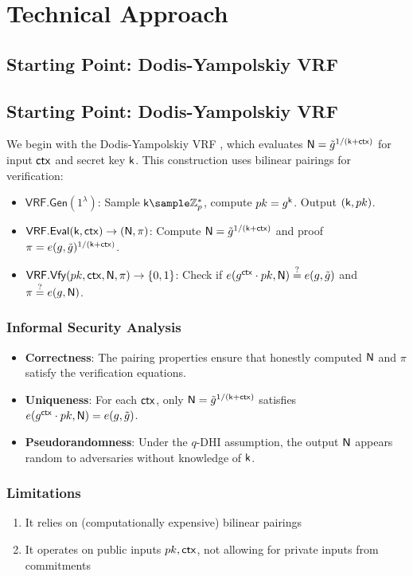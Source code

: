 \section{Technical Approach}

\subsection{Starting Point: Dodis-Yampolskiy VRF}

\subsection{Starting Point: Dodis-Yampolskiy VRF}
We begin with the Dodis-Yampolskiy VRF \cite{hutchison_verifiable_2005}, which evaluates $\mathsf{N} = \tilde{g}^{1/(\mathsf{k} + \mathsf{ctx})}$ for input $\mathsf{ctx}$ and secret key $\mathsf{k}$. This construction uses bilinear pairings for verification:

\begin{itemize}
    \item $\mathsf{VRF.Gen}(1^\lambda)$: Sample $\k \sample \mathbb{Z}_p^*$, compute $pk = g^{\mathsf{k}}$. Output $(\mathsf{k}, pk)$.
    \item $\mathsf{VRF.Eval}(\mathsf{k}, \mathsf{ctx}) \to (\mathsf{N}, \pi)$: Compute $\mathsf{N} = \tilde{g}^{1/(\mathsf{k} + \mathsf{ctx})}$ and proof $\pi = e(g, \tilde{g})^{1/(\mathsf{k} + \mathsf{ctx})}$.
    \item $\mathsf{VRF.Vfy}(pk, \mathsf{ctx}, \mathsf{N}, \pi) \to \{0, 1\}$: Check if $e(g^{\mathsf{ctx}} \cdot pk, \mathsf{N}) \stackrel{?}{=} e(g, \tilde{g})$ and $\pi \stackrel{?}{=} e(g, \mathsf{N})$.
\end{itemize}

\subsubsection{Informal Security Analysis}
\begin{itemize}
    \item \textbf{Correctness}: The pairing properties ensure that honestly computed $\mathsf{N}$ and $\pi$ satisfy the verification equations.
    \item \textbf{Uniqueness}: For each $\mathsf{ctx}$, only $\mathsf{N} = \tilde{g}^{1/(\mathsf{k} + \mathsf{ctx})}$ satisfies $e(g^{\mathsf{ctx}} \cdot pk, \mathsf{N}) = e(g, \tilde{g})$.
    \item \textbf{Pseudorandomness}: Under the $q$-DHI assumption, the output $\mathsf{N}$ appears random to adversaries without knowledge of $\mathsf{k}$.
\end{itemize}

\subsubsection{Limitations}
\begin{enumerate}
    \item It relies on (computationally expensive) bilinear pairings
    \item It operates on public inputs $pk, \mathsf{ctx}$, not allowing for private inputs from commitments
\end{enumerate}

